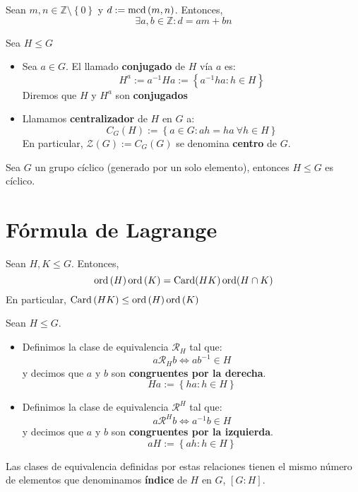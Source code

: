         \begin{prop}
        Sean $m, n \in \mathbb{Z}\setminus \left\{ 0 \right\}$ y $d := \operatorname{mcd} \left( m, n \right)$. Entonces,
        \[
        \exists a, b \in \mathbb{Z} : d = am + bn
        \]
    \end{prop}

    \begin{defi}
        Sea $H \le G$
        \begin{itemize}
        \item Sea $a \in G$. El llamado \textbf{conjugado} de $H$ vía $a$ es:
        \[
        H^a := a^{-1}Ha := \left\{ a^{-1}ha : h \in H \right\}
        \]
        Diremos que $H$ y $H^a$ son \textbf{conjugados}

        \item Llamamos \textbf{centralizador} de $H$ en $G$ a:
        \[
        C_G\left( H \right) := \left\{ a \in G: ah = ha\ \forall h \in H \right\}
        \]
        En particular, $\mathcal{Z}\left( G \right) := C_G\left( G \right)$ se denomina \textbf{centro} de $G$.
        \end{itemize}
    \end{defi}

    \begin{prop}
        Sea $G$ un grupo cíclico (generado por un solo elemento), entonces $H \le G$ es cíclico.
    \end{prop}

\section{Fórmula de Lagrange}
    \begin{prop}
        Sean $H, K \le G$. Entonces,
        \[
        \operatorname{ord}\left( H \right)\operatorname{ord}\left( K \right) = \operatorname{Card}(HK)\operatorname{ord}(H \cap K)
        \]
        En particular, $\operatorname{Card}\left( HK \right) \le \operatorname{ord}\left( H \right) \operatorname{ord}\left( K \right)$
    \end{prop}

    \begin{defi}
        Sean $H \le G$.
        \begin{itemize}
            \item Definimos la clase de equivalencia $\mathcal{R}_H$ tal que:
            \[
            a \mathcal{R}_H b \Leftrightarrow a b^{-1} \in H
            \]
            y decimos que $a$ y $b$ son \textbf{congruentes por la derecha}.
            \[
            Ha := \left\{ ha : h \in H \right\}
            \]
            \item Definimos la clase de equivalencia $\mathcal{R}^H$ tal que:
            \[
            a \mathcal{R}^H b \Leftrightarrow a^{-1}b \in H
            \]
            y decimos que $a$ y $b$ son \textbf{congruentes por la izquierda}.
            \[
            a H := \left\{ ah : h \in H \right\}
            \]
        \end{itemize}
        Las clases de equivalencia definidas por estas relaciones tienen el mismo número de elementos que denominamos \textbf{índice} de $H$ en $G$, $\left[ G : H \right]$.
    \end{defi}

